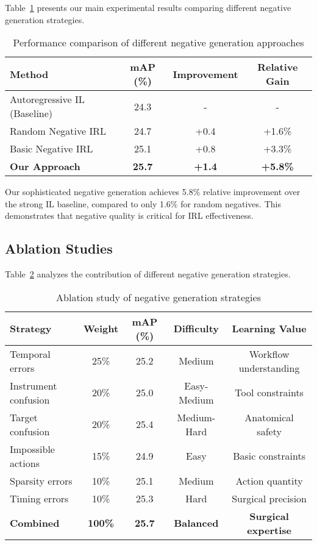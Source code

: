 \documentclass[runningheads]{llncs}
\begin{document}
Table~\ref{tab:main_results} presents our main experimental results comparing different negative generation strategies.

\begin{table}[h]
\centering
\caption{Performance comparison of different negative generation approaches}
\label{tab:main_results}
\begin{tabular}{lccc}
\toprule
Method & mAP (\%) & Improvement & Relative Gain \\
\midrule
Autoregressive IL (Baseline) & 24.3 & - & - \\
Random Negative IRL & 24.7 & +0.4 & +1.6\% \\
Basic Negative IRL & 25.1 & +0.8 & +3.3\% \\
\textbf{Our Approach} & \textbf{25.7} & \textbf{+1.4} & \textbf{+5.8\%} \\
\bottomrule
\end{tabular}
\end{table}

Our sophisticated negative generation achieves 5.8\% relative improvement over the strong IL baseline, compared to only 1.6\% for random negatives. This demonstrates that negative quality is critical for IRL effectiveness.

\subsection{Ablation Studies}

Table~\ref{tab:ablation} analyzes the contribution of different negative generation strategies.

\begin{table}[h]
\centering
\caption{Ablation study of negative generation strategies}
\label{tab:ablation}
\begin{tabular}{lcccc}
\toprule
Strategy & Weight & mAP (\%) & Difficulty & Learning Value \\
\midrule
Temporal errors & 25\% & 25.2 & Medium & Workflow understanding \\
Instrument confusion & 20\% & 25.0 & Easy-Medium & Tool constraints \\
Target confusion & 20\% & 25.4 & Medium-Hard & Anatomical safety \\
Impossible actions & 15\% & 24.9 & Easy & Basic constraints \\
Sparsity errors & 10\% & 25.1 & Medium & Action quantity \\
Timing errors & 10\% & 25.3 & Hard & Surgical precision \\
\midrule
\textbf{Combined} & \textbf{100\%} & \textbf{25.7} & \textbf{Balanced} & \textbf{Surgical expertise} \\
\bottomrule
\end{tabular}
\end{table}
\end{document}
